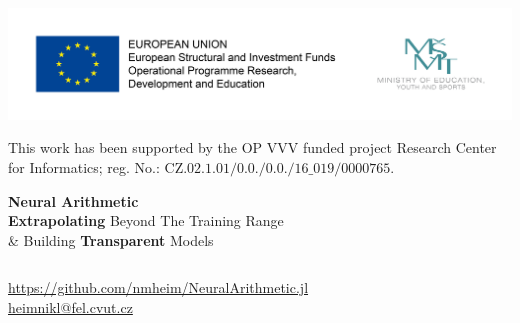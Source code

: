 \documentclass[aspectratio=169,professionalfont,xcolor={dvipsnames},hyperref={colorlinks=true,urlcolor=MidnightBlue}]{beamer}
\begin{document}
\begin{frame}
  \includegraphics[width=\textwidth]{rci.jpg}

  This work has been supported by the OP VVV funded project Research Center
  for Informatics; reg. No.: CZ$.02.1.01/0.0./0.0./16\_019/0000765$.
\end{frame} 



\begin{frame}
  \centering
  {\huge\bf Neural Arithmetic} \\
  \vspace{.5cm}
  \textbf{Extrapolating} Beyond The Training Range \\
  \& Building \textbf{Transparent} Models
  \vfill

  \begin{columns}
  \end{columns}
  \vfill

  \vfill
  {\small \url{https://github.com/nmheim/NeuralArithmetic.jl}}\\
  {\small \url{heimnikl@fel.cvut.cz}}
\end{frame}
\end{document}
